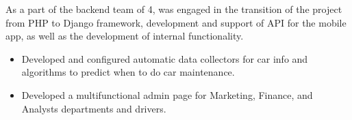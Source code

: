 As a part of the backend team of 4, was engaged in the transition of the project from PHP to Django framework, development and support of API for the mobile app, as well as the development of internal functionality.

\begin{itemize}
    \item Developed and configured automatic data collectors for car info and algorithms to predict when to do car maintenance.
    \item Developed a multifunctional admin page for Marketing, Finance, and Analysts departments and drivers.
\end {itemize}
